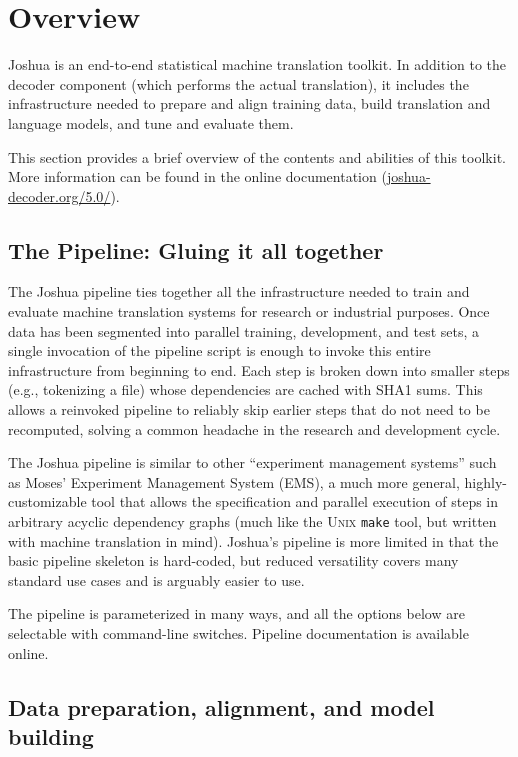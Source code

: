 \documentclass[11pt]{article}
\begin{document}
\section{Overview}

Joshua is an end-to-end statistical machine translation toolkit. In
addition to the decoder component (which performs the actual
translation), it includes the infrastructure needed to prepare and
align training data, build translation and language models, and tune
and evaluate them.

This section provides a brief overview of the contents and abilities
of this toolkit. More information can be found in the online
documentation (\url{joshua-decoder.org/5.0/}).

\subsection{The Pipeline: Gluing it all together}

The Joshua pipeline ties together all the infrastructure needed to
train and evaluate machine translation systems for research or
industrial purposes. Once data has been segmented into parallel
training, development, and test sets, a single invocation of the
pipeline script is enough to invoke this entire infrastructure from
beginning to end. Each step is broken down into smaller steps (e.g.,
tokenizing a file) whose dependencies are cached with SHA1 sums. This
allows a reinvoked pipeline to reliably skip earlier steps that do not
need to be recomputed, solving a common headache in the research and
development cycle.

The Joshua pipeline is similar to other ``experiment management
systems'' such as Moses' Experiment Management System (EMS), a much
more general, highly-customizable tool that allows the specification
and parallel execution of steps in arbitrary acyclic dependency graphs
(much like the \textsc{Unix} \verb|make| tool, but written with
machine translation in mind). Joshua's pipeline is more limited in
that the basic pipeline skeleton is hard-coded, but reduced
versatility covers many standard use cases and is arguably easier to
use.

The pipeline is parameterized in many ways, and all the options below
are selectable with command-line switches. Pipeline documentation is
available online.

\subsection{Data preparation, alignment, and model building}
\end{document}
